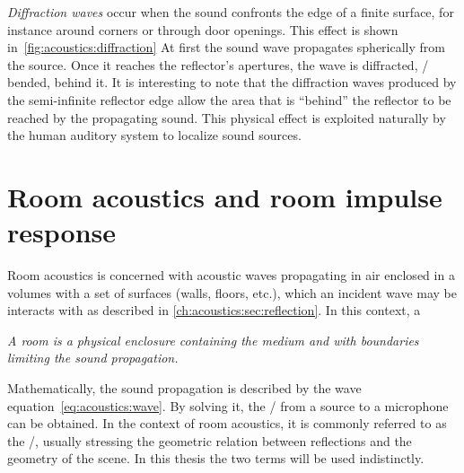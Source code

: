 \textit{Diffraction waves} occur when the sound confronts the edge of a finite surface, for instance around corners or through door openings.
This effect is shown in~\cref{fig:acoustics:diffraction}
At first the sound wave propagates spherically from the source.
Once it reaches the reflector's  apertures, the wave is diffracted, \ie/ bended, behind it.
It is interesting to note that the diffraction waves produced by the semi-infinite reflector edge
allow the area that is ``behind'' the reflector to be reached by the propagating sound.
This physical effect is exploited naturally by the human auditory system to localize sound sources.

\section{Room acoustics and room impulse response}\label{ch:acoustics:sec:rir}
Room acoustics is concerned with acoustic waves propagating in air enclosed in a volumes with a set of surfaces
(walls, floors, etc.), which an incident wave may be interacts with as described in \cref{ch:acoustics:sec:reflection}.
In this context, a
\begin{center}
    \textit{A room is a physical enclosure containing the medium and with boundaries limiting the sound propagation.}
\end{center}

Mathematically, the sound propagation is described by the wave equation~\eqref{eq:acoustics:wave}.
By solving it, the \AIRdef/
from a source to a microphone can be obtained.
In the context of room acoustics, it is commonly referred to as the \RIRdef/, usually stressing
the geometric relation between reflections and the geometry of the scene.
In this thesis the two terms will be used indistinctly.

